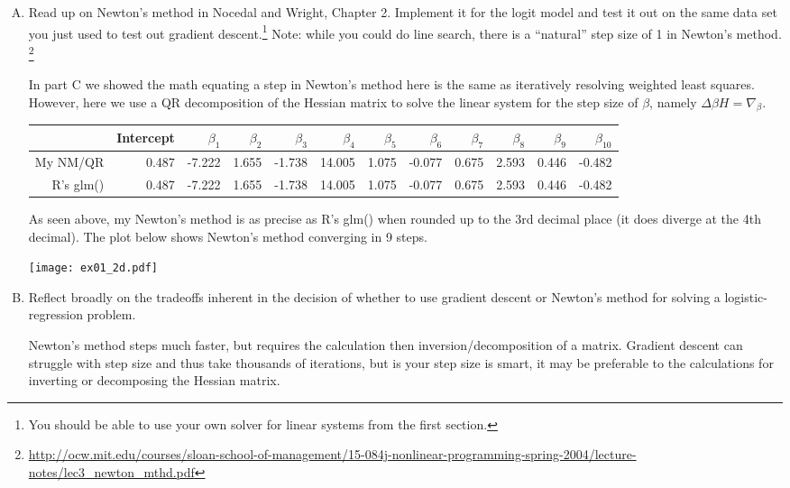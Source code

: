 \documentclass{article}
\begin{document}
\begin{enumerate}[(A)]
\item Read up on Newton's method in Nocedal and Wright, Chapter 2.  Implement it for the logit model and test it out on the same data set you just used to test out gradient descent.\footnote{You should be able to use your own solver for linear systems from the first section.}  Note: while you could do line search, there is a ``natural'' step size of 1 in Newton's method.
\footnote{\url{http://ocw.mit.edu/courses/sloan-school-of-management/15-084j-nonlinear-programming-spring-2004/lecture-notes/lec3_newton_mthd.pdf}}

\color{blue}
In part C we showed the math equating a step in Newton's method here is the same as iteratively resolving weighted least squares. However, here we use a QR decomposition of the Hessian matrix to solve the linear system for the step size of $\beta$, namely $\Delta\beta H = \nabla_\beta$. 

\begin{center}
\begin{tabular}{rrrrrrrrrrrr}
  \hline
 & Intercept & $\beta_1$ &$ \beta_2 $&$ \beta_3 $& $\beta_4 $& $\beta_5 $& $\beta_6 $&$ \beta_7$ & $\beta_8 $& $\beta_9$ & $\beta_{10}$ \\ 
 \hline
  My NM/QR & 0.487 & -7.222 & 1.655 & -1.738 & 14.005 & 1.075 & -0.077 & 0.675 & 2.593 & 0.446 & -0.482 \\ 
    R's glm()  & 0.487 & -7.222 & 1.655 & -1.738 & 14.005 & 1.075 & -0.077 & 0.675 & 2.593 & 0.446 & -0.482 \\ 
   \hline
\end{tabular}
\end{center}
As seen above, my Newton's method is as precise as R's glm() when rounded up to the 3rd decimal place (it does diverge at the 4th decimal).  The plot below  shows Newton's method converging in 9 steps. 
\begin{center}
\texttt{[image: ex01\_2d.pdf]}
\end{center}
\color{black}

\item Reflect broadly on the tradeoffs inherent in the decision of whether to use gradient descent or Newton's method for solving a logistic-regression problem.

\color{blue}
Newton's method steps much faster, but requires the calculation then  inversion/decomposition of a matrix. Gradient descent can struggle with step size and thus take thousands of iterations, but is your step size is smart, it may be preferable to the calculations for 
 inverting or decomposing the Hessian matrix. 

\end{enumerate}
\end{document}

